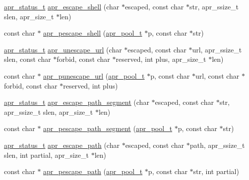 \begin{DoxyCompactItemize}
\item 
\hyperlink{group__apr__errno_gaf76ee4543247e9fb3f3546203e590a6c}{apr\+\_\+status\+\_\+t} \hyperlink{group___a_p_r___util___escaping_gafdfca9adc06570fa6efd802e24dce6d1}{apr\+\_\+escape\+\_\+shell} (char $\ast$escaped, const char $\ast$str, apr\+\_\+ssize\+\_\+t slen, apr\+\_\+size\+\_\+t $\ast$len)
\item 
const char $\ast$ \hyperlink{group___a_p_r___util___escaping_ga81e97334f8033bfbc3acd5e15262323e}{apr\+\_\+pescape\+\_\+shell} (\hyperlink{group__apr__pools_gaf137f28edcf9a086cd6bc36c20d7cdfb}{apr\+\_\+pool\+\_\+t} $\ast$p, const char $\ast$str)
\item 
\hyperlink{group__apr__errno_gaf76ee4543247e9fb3f3546203e590a6c}{apr\+\_\+status\+\_\+t} \hyperlink{group___a_p_r___util___escaping_ga9a6b08630ef5a605def1dfa4a54b026f}{apr\+\_\+unescape\+\_\+url} (char $\ast$escaped, const char $\ast$url, apr\+\_\+ssize\+\_\+t slen, const char $\ast$forbid, const char $\ast$reserved, int plus, apr\+\_\+size\+\_\+t $\ast$len)
\item 
const char $\ast$ \hyperlink{group___a_p_r___util___escaping_gac713d5687a00134cef5c795dbf4e6dbe}{apr\+\_\+punescape\+\_\+url} (\hyperlink{group__apr__pools_gaf137f28edcf9a086cd6bc36c20d7cdfb}{apr\+\_\+pool\+\_\+t} $\ast$p, const char $\ast$url, const char $\ast$forbid, const char $\ast$reserved, int plus)
\item 
\hyperlink{group__apr__errno_gaf76ee4543247e9fb3f3546203e590a6c}{apr\+\_\+status\+\_\+t} \hyperlink{group___a_p_r___util___escaping_ga2fba5a28f4924f00f1ba9a56bc87f651}{apr\+\_\+escape\+\_\+path\+\_\+segment} (char $\ast$escaped, const char $\ast$str, apr\+\_\+ssize\+\_\+t slen, apr\+\_\+size\+\_\+t $\ast$len)
\item 
const char $\ast$ \hyperlink{group___a_p_r___util___escaping_ga36bd45eb1f919fe61f04f5e9087c6242}{apr\+\_\+pescape\+\_\+path\+\_\+segment} (\hyperlink{group__apr__pools_gaf137f28edcf9a086cd6bc36c20d7cdfb}{apr\+\_\+pool\+\_\+t} $\ast$p, const char $\ast$str)
\item 
\hyperlink{group__apr__errno_gaf76ee4543247e9fb3f3546203e590a6c}{apr\+\_\+status\+\_\+t} \hyperlink{group___a_p_r___util___escaping_gae67859a1d260f354c16e939d24d67058}{apr\+\_\+escape\+\_\+path} (char $\ast$escaped, const char $\ast$path, apr\+\_\+ssize\+\_\+t slen, int partial, apr\+\_\+size\+\_\+t $\ast$len)
\item 
const char $\ast$ \hyperlink{group___a_p_r___util___escaping_gacd4fc208448eb07af16350802077783a}{apr\+\_\+pescape\+\_\+path} (\hyperlink{group__apr__pools_gaf137f28edcf9a086cd6bc36c20d7cdfb}{apr\+\_\+pool\+\_\+t} $\ast$p, const char $\ast$str, int partial)

\end{DoxyCompactItemize}
